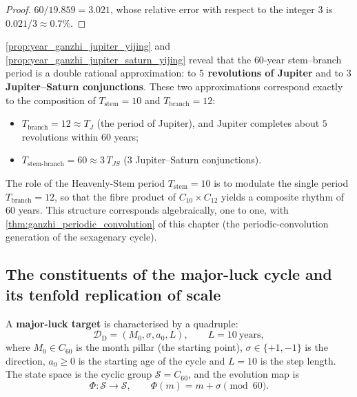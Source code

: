 \begin{proof}
$60/19.859=3.021$, whose relative error with respect to the integer $3$ is $0.021/3\approx 0.7\%$.
\end{proof}

\begin{remark}\label{rem:ganzhi_double_approximation_yijing}
\cref{prop:year_ganzhi_jupiter_yijing} and \cref{prop:year_ganzhi_jupiter_saturn_yijing} reveal that the $60$-year stem--branch period is a double rational approximation: to \textbf{$5$ revolutions of Jupiter} and to \textbf{$3$ Jupiter--Saturn conjunctions}. These two approximations correspond exactly to the composition of $T_{\text{stem}}=10$ and $T_{\text{branch}}=12$:
\begin{itemize}
    \item $T_{\text{branch}}=12\approx T_J$ (the period of Jupiter), and Jupiter completes about $5$ revolutions within $60$ years;
    \item $T_{\text{stem-branch}}=60\approx 3\,T_{JS}$ ($3$ Jupiter--Saturn conjunctions).
\end{itemize}
The role of the Heavenly-Stem period $T_{\text{stem}}=10$ is to modulate the single period $T_{\text{branch}}=12$, so that the fibre product of $C_{10}\times C_{12}$ yields a composite rhythm of $60$ years. This structure corresponds algebraically, one to one, with \cref{thm:ganzhi_periodic_convolution} of this chapter (the periodic-convolution generation of the sexagenary cycle).
\end{remark}

\subsection{The constituents of the major-luck cycle and its tenfold replication of scale}

\begin{definition}\label{def:dayun_target_yijing}
A \textbf{major-luck target} is characterised by a quadruple:
\[
\mathcal D_{\mathrm{D}}=(M_0,\sigma,a_0,L),\qquad L=10\ \text{years},
\]
where $M_0\in C_{60}$ is the month pillar (the starting point), $\sigma\in\{+1,-1\}$ is the direction, $a_0\ge 0$ is the starting age of the cycle and $L=10$ is the step length. The state space is the cyclic group $\mathcal S=C_{60}$, and the evolution map is
\[
\Phi:\mathcal S\to\mathcal S,\qquad \Phi(m)=m+\sigma\pmod{60}.
\]
\end{definition}

